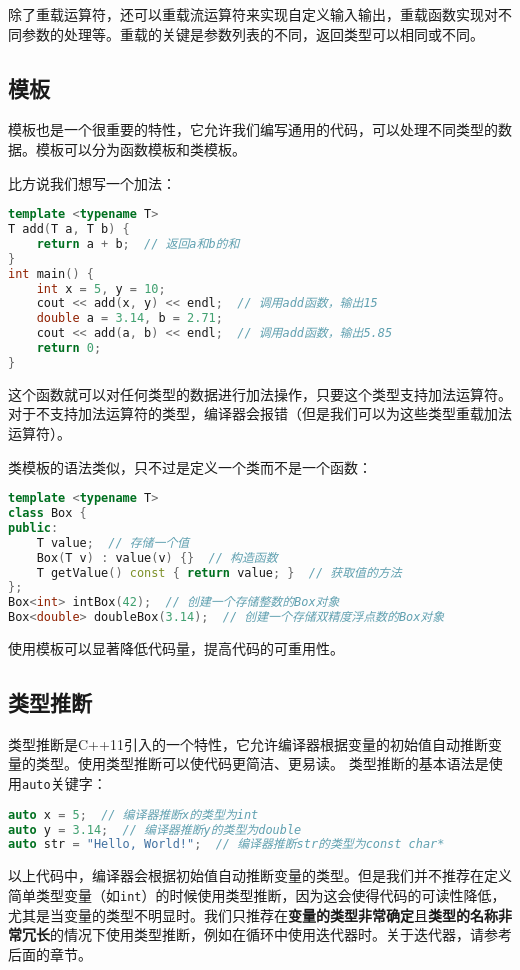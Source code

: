 \documentclass[../main.tex]{subfiles}
\begin{document}
除了重载运算符，还可以重载流运算符来实现自定义输入输出，重载函数实现对不同参数的处理等。重载的关键是参数列表的不同，返回类型可以相同或不同。

\subsection{模板}

模板也是一个很重要的特性，它允许我们编写通用的代码，可以处理不同类型的数据。模板可以分为函数模板和类模板。

比方说我们想写一个加法：
\begin{lstlisting}[language=C++]
template <typename T>
T add(T a, T b) {
    return a + b;  // 返回a和b的和
}
int main() {
    int x = 5, y = 10;
    cout << add(x, y) << endl;  // 调用add函数，输出15
    double a = 3.14, b = 2.71;
    cout << add(a, b) << endl;  // 调用add函数，输出5.85
    return 0;
}
\end{lstlisting}
这个函数就可以对任何类型的数据进行加法操作，只要这个类型支持加法运算符。对于不支持加法运算符的类型，编译器会报错（但是我们可以为这些类型重载加法运算符）。

类模板的语法类似，只不过是定义一个类而不是一个函数：
\begin{lstlisting}[language=C++]
template <typename T>
class Box {
public:
    T value;  // 存储一个值
    Box(T v) : value(v) {}  // 构造函数
    T getValue() const { return value; }  // 获取值的方法
};
Box<int> intBox(42);  // 创建一个存储整数的Box对象
Box<double> doubleBox(3.14);  // 创建一个存储双精度浮点数的Box对象
\end{lstlisting}
使用模板可以显著降低代码量，提高代码的可重用性。

\subsection{类型推断}

类型推断是C++11引入的一个特性，它允许编译器根据变量的初始值自动推断变量的类型。使用类型推断可以使代码更简洁、更易读。
类型推断的基本语法是使用\texttt{auto}关键字：
\begin{lstlisting}[language=C++]
auto x = 5;  // 编译器推断x的类型为int
auto y = 3.14;  // 编译器推断y的类型为double
auto str = "Hello, World!";  // 编译器推断str的类型为const char*
\end{lstlisting}
以上代码中，编译器会根据初始值自动推断变量的类型。但是我们并不推荐在定义简单类型变量（如\texttt{int}）的时候使用类型推断，因为这会使得代码的可读性降低，尤其是当变量的类型不明显时。我们只推荐在\textbf{变量的类型非常确定}且\textbf{类型的名称非常冗长}的情况下使用类型推断，例如在循环中使用迭代器时。关于迭代器，请参考后面的章节。
\end{document}
